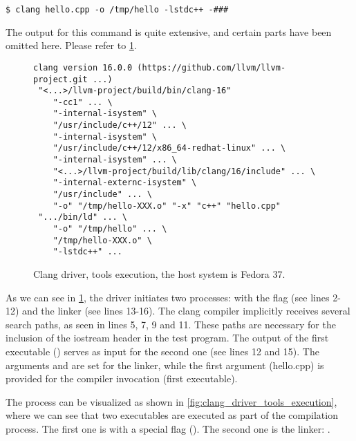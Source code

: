 \begin{adjustwidth}{0em}{0em}
\begin{verbatim}
$ clang hello.cpp -o /tmp/hello -lstdc++ -###
\end{verbatim}
\end{adjustwidth}

The output for this command is quite extensive, and certain parts have been
omitted here. Please refer to \cref{fig:driver_tools_execution}. 

\begin{figure}[H]
\begin{verbatim}
clang version 16.0.0 (https://github.com/llvm/llvm-project.git ...)
 "<...>/llvm-project/build/bin/clang-16"
    "-cc1" ... \
    "-internal-isystem" \
    "/usr/include/c++/12" ... \
    "-internal-isystem" \
    "/usr/include/c++/12/x86_64-redhat-linux" ... \
    "-internal-isystem" ... \
    "<...>/llvm-project/build/lib/clang/16/include" ... \ 
    "-internal-externc-isystem" \
    "/usr/include" ... \
    "-o" "/tmp/hello-XXX.o" "-x" "c++" "hello.cpp"
 ".../bin/ld" ... \
    "-o" "/tmp/hello" ... \
    "/tmp/hello-XXX.o" \
    "-lstdc++" ...
\end{verbatim}
\caption{Clang driver, tools execution, the host system is Fedora 37.} 
\label{fig:driver_tools_execution}
\end{figure}
As we can see in \cref{fig:driver_tools_execution}, the driver initiates two
processes: \myshell{clang-16} with the  flag (see lines 2-12) and
the linker \myshell{ld} (see lines 13-16). The clang compiler implicitly
receives several search paths, as seen in lines 5, 7, 9 and 11. These paths are
necessary for the inclusion of the iostream header in the test program. The
output of the first executable () serves as input for
the second one (see lines 12 and 15). The arguments  and
 are set for the linker, while the first argument
(hello.cpp) is provided for the compiler invocation (first executable). 

The process can be visualized as shown in
\cref{fig:clang_driver_tools_execution}, where we can see that two executables
are executed as part of the compilation process. The first one is
\myshell{bin/clang-16} with a special flag (\myshell{-cc1}). The second one is
the linker: \myshell{bin/ld}. 


